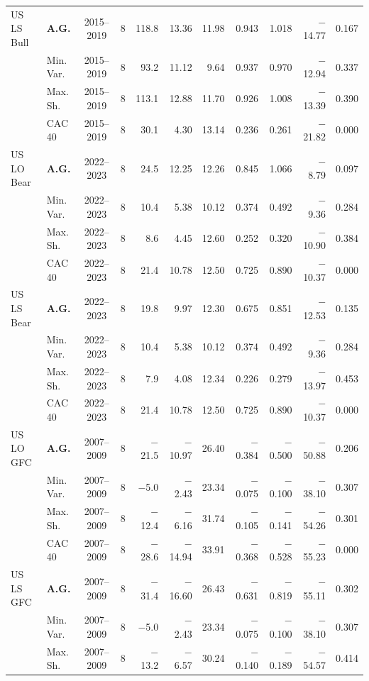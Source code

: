 \begin{longtable}{p{2.6cm} l c c r r r r r r r}
\midrule
US LS Bull & \textbf{A.G.} & 2015--2019 & 8 & 118.8 & 13.36 & 11.98 & 0.943 & 1.018 & $-$14.77 & 0.167 \\
 & Min.\,Var. & 2015--2019 & 8 & 93.2 & 11.12 & 9.64 & 0.937 & 0.970 & $-$12.94 & 0.337 \\
 & Max.\,Sh. & 2015--2019 & 8 & 113.1 & 12.88 & 11.70 & 0.926 & 1.008 & $-$13.39 & 0.390 \\
 & CAC 40 & 2015--2019 & 8 & 30.1 & 4.30 & 13.14 & 0.236 & 0.261 & $-$21.82 & 0.000 \\
\midrule
US LO Bear & \textbf{A.G.} & 2022--2023 & 8 & 24.5 & 12.25 & 12.26 & 0.845 & 1.066 & $-$8.79 & 0.097 \\
 & Min.\,Var. & 2022--2023 & 8 & 10.4 & 5.38 & 10.12 & 0.374 & 0.492 & $-$9.36 & 0.284 \\
 & Max.\,Sh. & 2022--2023 & 8 & 8.6 & 4.45 & 12.60 & 0.252 & 0.320 & $-$10.90 & 0.384 \\
 & CAC 40 & 2022--2023 & 8 & 21.4 & 10.78 & 12.50 & 0.725 & 0.890 & $-$10.37 & 0.000 \\
\midrule
US LS Bear & \textbf{A.G.} & 2022--2023 & 8 & 19.8 & 9.97 & 12.30 & 0.675 & 0.851 & $-$12.53 & 0.135 \\
 & Min.\,Var. & 2022--2023 & 8 & 10.4 & 5.38 & 10.12 & 0.374 & 0.492 & $-$9.36 & 0.284 \\
 & Max.\,Sh. & 2022--2023 & 8 & 7.9 & 4.08 & 12.34 & 0.226 & 0.279 & $-$13.97 & 0.453 \\
 & CAC 40 & 2022--2023 & 8 & 21.4 & 10.78 & 12.50 & 0.725 & 0.890 & $-$10.37 & 0.000 \\
\midrule
US LO GFC & \textbf{A.G.} & 2007--2009 & 8 & $-$21.5 & $-$10.97 & 26.40 & $-$0.384 & $-$0.500 & $-$50.88 & 0.206 \\
 & Min.\,Var. & 2007--2009 & 8 & $-$5.0 & $-$2.43 & 23.34 & $-$0.075 & $-$0.100 & $-$38.10 & 0.307 \\
 & Max.\,Sh. & 2007--2009 & 8 & $-$12.4 & $-$6.16 & 31.74 & $-$0.105 & $-$0.141 & $-$54.26 & 0.301 \\
 & CAC 40 & 2007--2009 & 8 & $-$28.6 & $-$14.94 & 33.91 & $-$0.368 & $-$0.528 & $-$55.23 & 0.000 \\
\midrule
US LS GFC & \textbf{A.G.} & 2007--2009 & 8 & $-$31.4 & $-$16.60 & 26.43 & $-$0.631 & $-$0.819 & $-$55.11 & 0.302 \\
 & Min.\,Var. & 2007--2009 & 8 & $-$5.0 & $-$2.43 & 23.34 & $-$0.075 & $-$0.100 & $-$38.10 & 0.307 \\
 & Max.\,Sh. & 2007--2009 & 8 & $-$13.2 & $-$6.57 & 30.24 & $-$0.140 & $-$0.189 & $-$54.57 & 0.414 \\

\end{longtable}
